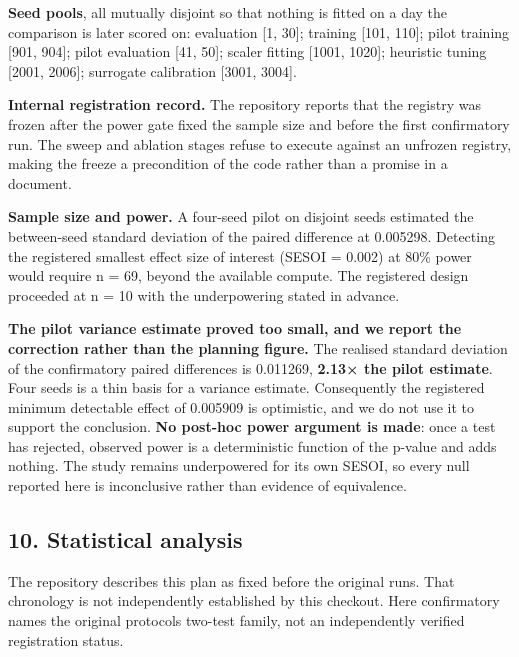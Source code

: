 \documentclass[
]{article}
\begin{document}
\textbf{Seed pools}, all mutually disjoint so that nothing is fitted on
a day the comparison is later scored on: evaluation {[}1, 30{]};
training {[}101, 110{]}; pilot training {[}901, 904{]}; pilot evaluation
{[}41, 50{]}; scaler fitting {[}1001, 1020{]}; heuristic tuning {[}2001,
2006{]}; surrogate calibration {[}3001, 3004{]}.

\textbf{Internal registration record.} The repository reports that the
registry was frozen after the power gate fixed the sample size and
before the first confirmatory run. The sweep and ablation stages refuse
to execute against an unfrozen registry, making the freeze a
precondition of the code rather than a promise in a document.

\textbf{Sample size and power.} A four-seed pilot on disjoint seeds
estimated the between-seed standard deviation of the paired difference
at 0.005298. Detecting the registered smallest effect size of interest
(SESOI = 0.002) at 80\% power would require n = 69, beyond the available
compute. The registered design proceeded at n = 10 with the
underpowering stated in advance.

\textbf{The pilot variance estimate proved too small, and we report the
correction rather than the planning figure.} The realised standard
deviation of the confirmatory paired differences is 0.011269,
\textbf{2.13× the pilot estimate}. Four seeds is a thin basis for a
variance estimate. Consequently the registered minimum detectable effect
of 0.005909 is optimistic, and we do not use it to support the
conclusion. \textbf{No post-hoc power argument is made}: once a test has
rejected, observed power is a deterministic function of the p-value and
adds nothing. The study remains underpowered for its own SESOI, so every
null reported here is inconclusive rather than evidence of equivalence.

\subsection{10. Statistical analysis}\label{10-statistical-analysis}

The repository describes this plan as fixed before the original runs.
That chronology is not independently established by this checkout. Here
\textquotesingle confirmatory\textquotesingle{} names the original
protocol\textquotesingle s two-test family, not an independently
verified registration status.
\end{document}
